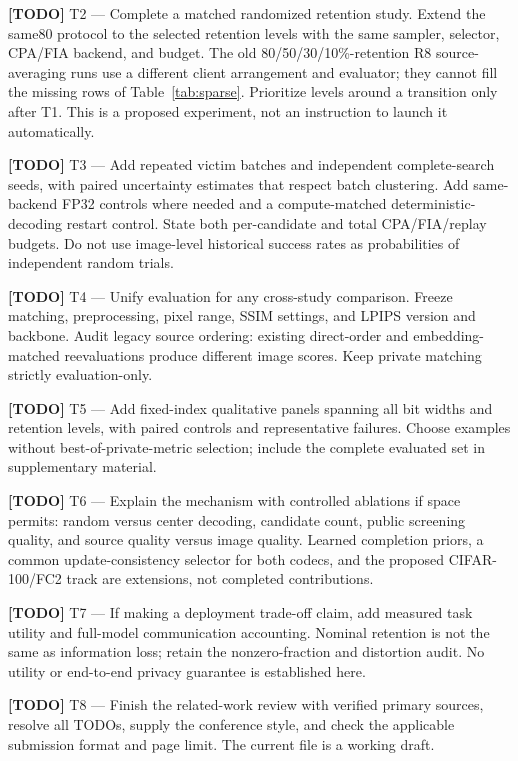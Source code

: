 \documentclass{article}
\newcommand{\todo}[1]{\par\noindent\textbf{[TODO]} #1\par}
\begin{document}
\todo{T2 --- Complete a matched randomized retention study. Extend the
same80 protocol to the selected retention levels with the same sampler,
selector, CPA/FIA backend, and budget. The old 80/50/30/10\%-retention
R8 source-averaging runs use a different client arrangement and evaluator;
they cannot fill the missing rows of Table~\ref{tab:sparse}. Prioritize
levels around a transition only after T1. This is a proposed experiment,
not an instruction to launch it automatically.}

\todo{T3 --- Add repeated victim batches and independent complete-search
seeds, with paired uncertainty estimates that respect batch clustering.
Add same-backend FP32 controls where needed and a compute-matched
deterministic-decoding restart control. State both per-candidate and total
CPA/FIA/replay budgets. Do not use image-level historical success rates
as probabilities of independent random trials.}

\todo{T4 --- Unify evaluation for any cross-study comparison. Freeze
matching, preprocessing, pixel range, SSIM settings, and LPIPS version and
backbone. Audit legacy source ordering: existing direct-order and
embedding-matched reevaluations produce different image scores. Keep
private matching strictly evaluation-only.}

\todo{T5 --- Add fixed-index qualitative panels spanning all bit widths
and retention levels, with paired controls and representative failures.
Choose examples without best-of-private-metric selection; include the
complete evaluated set in supplementary material.}

\todo{T6 --- Explain the mechanism with controlled ablations if space
permits: random versus center decoding, candidate count, public screening
quality, and source quality versus image quality. Learned completion
priors, a common update-consistency selector for both codecs, and the
proposed CIFAR-100/FC2 track are extensions, not completed contributions.}

\todo{T7 --- If making a deployment trade-off claim, add measured task
utility and full-model communication accounting. Nominal retention is not
the same as information loss; retain the nonzero-fraction and distortion
audit. No utility or end-to-end privacy guarantee is established here.}

\todo{T8 --- Finish the related-work review with verified primary sources,
resolve all TODOs, supply the conference style, and check the applicable
submission format and page limit. The current file is a working draft.}
\fi
\end{document}
